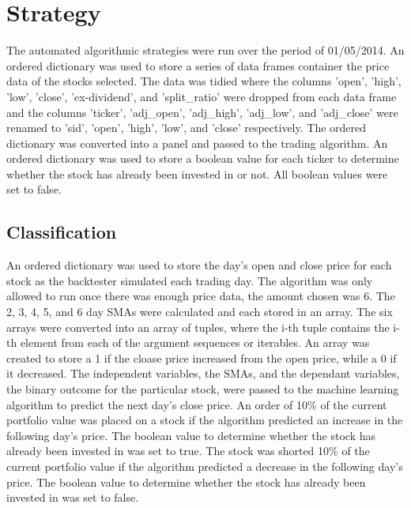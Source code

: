 \section{Strategy}
The automated algorithmic strategies were run over the period of 01/05/2014. An ordered dictionary was used to store a series of data frames container the price data of the stocks selected. The data was tidied where the columns 'open', 'high', 'low', 'close', 'ex-dividend', and 'split\_ratio' were dropped from each data frame and the columns 'ticker', 'adj\_open', 'adj\_high', 'adj\_low', and 'adj\_close' were renamed to 'sid', 'open', 'high', 'low', and 'close' respectively. The ordered dictionary was converted into a panel and passed to the trading algorithm. An ordered dictionary was used to store a boolean value for each ticker to determine whether the stock has already been invested in or not. All boolean values were set to false. 

\subsection{Classification}
An ordered dictionary was used to store the day's open and close price for each stock as the backtester simulated each trading day. The algorithm was only allowed to run once there was enough price data, the amount chosen was 6. The 2, 3, 4, 5, and 6 day SMAs were calculated and each stored in an array. The six arrays were converted into an array of tuples, where the i-th tuple contains the i-th element from each of the argument sequences or iterables. An array was created to store a 1 if the cloase price increased from the open price, while a 0 if it decreased. The independent variables, the SMAs, and the dependant variables, the binary outcome for the particular stock, were passed to the machine learning algorithm to predict the next day's close price. An order of 10\% of the current portfolio value was placed on a stock if the algorithm predicted an increase in the following day's price. The boolean value to determine whether the stock has already been invested in was set to true. The stock was shorted 10\% of the current portfolio value if the algorithm predicted a decrease in the following day's price. The boolean value to determine whether the stock has already been invested in was set to false.

